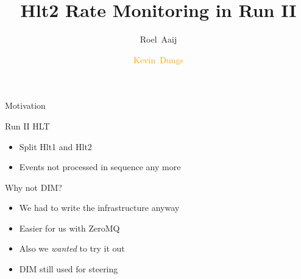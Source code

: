\documentclass[aspectratio=1610,compress,titleprogressbar]{beamer}
\title{Hlt2 Rate Monitoring in Run II}
\author[K.~Dungs]{Roel~Aaij\inst{1} \and \textcolor{orange}{Kevin~Dungs\inst{2}}}
\institute{\inst{1} CERN \and \inst{2} TU Dortmund}
\begin{document}
\maketitle

\begin{frame}{Motivation}
  \begin{block}{Run II HLT}
    \begin{itemize}
      \item Split Hlt1 and Hlt2
      \item Events not processed in sequence any more
    \end{itemize}
  \end{block}
  \begin{block}{Why not DIM?}
    \begin{itemize}
      \item We had to write the infrastructure anyway
      \item Easier for us with ZeroMQ
      \item Also we \emph{wanted} to try it out
      \item DIM still used for steering
    \end{itemize}
  \end{block}
\end{frame}
\end{document}
